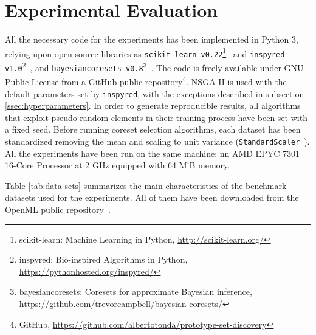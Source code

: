 \documentclass{article}
\begin{document}
\section{Experimental Evaluation}
\label{sec:experiments}

All the necessary code for the experiments has been implemented in Python 3, relying upon open-source libraries as \texttt{scikit-learn v0.22}\footnote{scikit-learn: Machine Learning in Python, \url{http://scikit-learn.org/}}~\cite{scikit-learn} and \texttt{inspyred v1.0}\footnote{inspyred: Bio-inspired Algorithms in Python, \url{https://pythonhosted.org/inspyred/}}~\cite{inspyred}, and \texttt{bayesiancoresets v0.8}\footnote{bayesiancoresets: Coresets for approximate Bayesian inference, \url{https://github.com/trevorcampbell/bayesian-coresets/}}~\cite{campbell2019sparse}. The code is freely available under GNU Public License from a GitHub public repository\footnote{GitHub, \url{https://github.com/albertotonda/prototype-set-discovery}}. NSGA-II is used with the default parameters set by \texttt{inspyred}, with the exceptions described in subsection \ref{ssec:hyperparameters}. In order to generate reproducible results, all algorithms that exploit pseudo-random elements in their training process have been set with a fixed seed. Before running coreset selection algorithms, each dataset has been standardized removing the mean and scaling to unit variance (\texttt{StandardScaler}~\cite{zill2011advanced}). All the experiments have been run on the same machine: nn AMD EPYC 7301 16-Core Processor at 2 GHz equipped with 64 MiB memory.

Table \ref{tab:data-sets} summarizes the main characteristics of the benchmark datasets used for the experiments. All of them have been downloaded from the OpenML public repository~\cite{OpenML2013,OpenMLPython2019}. 
\end{document}
